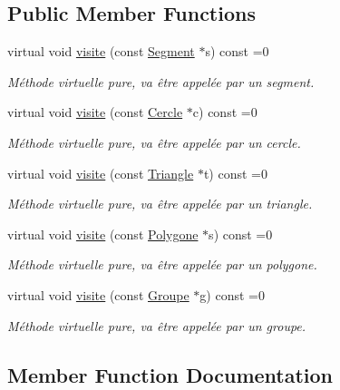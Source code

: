 \subsection*{Public Member Functions}
\begin{DoxyCompactItemize}
\item 
virtual void \hyperlink{class_visiteur_ab63ea127a0ac3cfa12c4cbdd9d9c8eb2}{visite} (const \hyperlink{class_segment}{Segment} $\ast$s) const =0
\begin{DoxyCompactList}\small\item\em Méthode virtuelle pure, va être appelée par un segment. \end{DoxyCompactList}\item 
virtual void \hyperlink{class_visiteur_a0af8611572f009ff37b9429facc7eaec}{visite} (const \hyperlink{class_cercle}{Cercle} $\ast$c) const =0
\begin{DoxyCompactList}\small\item\em Méthode virtuelle pure, va être appelée par un cercle. \end{DoxyCompactList}\item 
virtual void \hyperlink{class_visiteur_a65332165fada93947fbad9a4d9eebf2c}{visite} (const \hyperlink{class_triangle}{Triangle} $\ast$t) const =0
\begin{DoxyCompactList}\small\item\em Méthode virtuelle pure, va être appelée par un triangle. \end{DoxyCompactList}\item 
virtual void \hyperlink{class_visiteur_a0a7c596d84a8750e3a670330a1001538}{visite} (const \hyperlink{class_polygone}{Polygone} $\ast$s) const =0
\begin{DoxyCompactList}\small\item\em Méthode virtuelle pure, va être appelée par un polygone. \end{DoxyCompactList}\item 
virtual void \hyperlink{class_visiteur_a812aa03fad51d8aec386f8df7f9b5353}{visite} (const \hyperlink{class_groupe}{Groupe} $\ast$g) const =0
\begin{DoxyCompactList}\small\item\em Méthode virtuelle pure, va être appelée par un groupe. \end{DoxyCompactList}\end{DoxyCompactItemize}


\subsection{Member Function Documentation}
\mbox{\label{class_visiteur_ab63ea127a0ac3cfa12c4cbdd9d9c8eb2}} 
